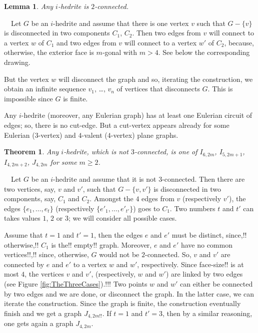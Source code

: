 \documentclass[12pt]{article}
\newtheorem{theorem}{Theorem}
\newtheorem{lemma}{Lemma}
\newcommand{\proof}{\noindent{\bf Proof.}\ \ }
\begin{document}
\begin{lemma}
Any $i$-hedrite is $2$-connected.
\end{lemma}
\proof Let $G$ be an $i$-hedrite and assume that there is one vertex $v$ such that $G-\{v\}$ is disconnected in two components $C_1$, $C_2$. Then two edges from $v$ will connect to a vertex $w$ of $C_1$ and two edges from $v$ will connect to a vertex $w'$ of $C_2$, because, otherwise, the exterior face is $m$-gonal with $m>4$. See below the corresponding drawing.

\begin{center}
\epsfxsize=60mm
\end{center}

But the vertex $w$ will disconnect the graph and so, iterating the construction, we obtain an infinite sequence $v_1$, \dots, $v_n$ of vertices that disconnects $G$. 
This is impossible since $G$ is finite.


Any $i$-hedrite (moreover, any Eulerian graph) has at least one 
Eulerian circuit of edges; so, there is no cut-edge.
But a cut-vertex appears already for some Eulerian ($3$-vertex)
and $4$-valent ($4$-vertex) plane graphs.


\begin{theorem}\label{3-connectedness}
Any $i$-hedrite, which is not $3$-connected, is one of $I_{6,2m}$, $I_{5, 2m+1}$, $I_{4, 2m+2}$, $J_{4, 2m}$ for some $m\geq 2$.


\end{theorem}

\proof Let $G$ be an $i$-hedrite and assume that it is not $3$-connected. 
Then there are two vertices, say, $v$ and $v'$, such that 
$G-\{v, v'\}$ is disconnected in two components, say, $C_1$ and $C_2$.
Amongst the $4$ edges from $v$ (respectively $v'$), the edges 
$\{e_1,\dots, e_{t}\}$ (respectively $\{e'_1,\dots, e'_{t'}\}$) goes
to $C_1$. Two numbers $t$ and $t'$ can takes values $1$, $2$ or $3$; we
will consider all possible cases.

Assume that $t=1$ and $t'=1$, then the edges $e$ and $e'$ must be
distinct, since,!! otherwise,!! $C_1$ is the!! empty!! graph. Moreover, $e$ and $e'$ have
no common vertices!!,!! since, otherwise, $G$ would not be $2$-connected.
So, $v$ and $v'$ are connected by $e$ and $e'$ to a vertex $w$ and $w'$,
respectively. Since face-size!! is at most $4$, the vertices $v$ and $v'$,
(respectively, $w$ and $w'$) are linked by two edges
(see Figure \ref{fig:TheThreeCases}).!!!
Two points $w$ and $w'$ can either be connected by two edges and
we are done, or disconnect the graph. In the latter case, we can iterate
the construction. Since the graph is finite, the construction eventually
finish and we get a graph $J_{4,2m!!}$. If $t=1$ and
$t'=3$, then by a similar reasoning, one gets again a graph $J_{4,2m}$.
\end{document}
